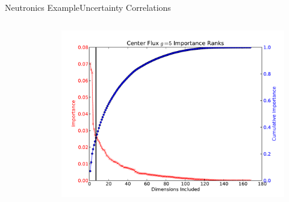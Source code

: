 \documentclass{beamer}
\begin{document}
\begin{frame}{Neutronics Example}{Uncertainty Correlations}
\begin{columns}
\begin{column}{0.5\textwidth}
\begin{figure}
      \end{figure}
    \end{column}
    \begin{column}{0.5\textwidth}
      \begin{figure}
        \centering
        \includegraphics[width=0.8\linewidth]{c5g7/C5G7_center_flux_5_impranks}
      \end{figure}
    \end{column}
  \end{columns}
\end{frame}
\end{document}

